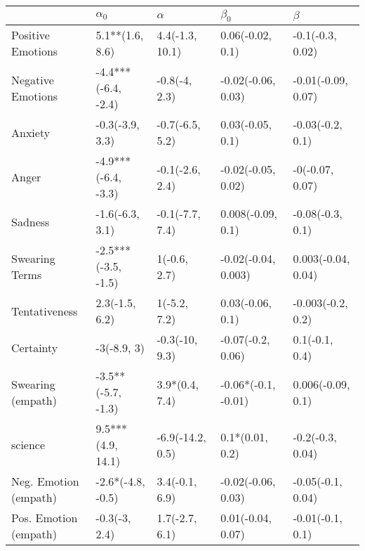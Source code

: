 \begin{tabular}{lllll}
\toprule
{} &           $\alpha_0$ &          $\alpha$ &            $\beta_0$ &             $\beta$ \\
\midrule
Positive Emotions     &      5.1**(1.6, 8.6) &   4.4(-1.3, 10.1) &     0.06(-0.02, 0.1) &    -0.1(-0.3, 0.02) \\
Negative Emotions     &  -4.4***(-6.4, -2.4) &     -0.8(-4, 2.3) &   -0.02(-0.06, 0.03) &  -0.01(-0.09, 0.07) \\
Anxiety               &      -0.3(-3.9, 3.3) &   -0.7(-6.5, 5.2) &     0.03(-0.05, 0.1) &    -0.03(-0.2, 0.1) \\
Anger                 &  -4.9***(-6.4, -3.3) &   -0.1(-2.6, 2.4) &   -0.02(-0.05, 0.02) &     -0(-0.07, 0.07) \\
Sadness               &      -1.6(-6.3, 3.1) &   -0.1(-7.7, 7.4) &    0.008(-0.09, 0.1) &    -0.08(-0.3, 0.1) \\
Swearing Terms        &  -2.5***(-3.5, -1.5) &      1(-0.6, 2.7) &  -0.02(-0.04, 0.003) &  0.003(-0.04, 0.04) \\
Tentativeness         &       2.3(-1.5, 6.2) &      1(-5.2, 7.2) &     0.03(-0.06, 0.1) &   -0.003(-0.2, 0.2) \\
Certainty             &          -3(-8.9, 3) &    -0.3(-10, 9.3) &    -0.07(-0.2, 0.06) &      0.1(-0.1, 0.4) \\
Swearing (empath)     &   -3.5**(-5.7, -1.3) &    3.9*(0.4, 7.4) &  -0.06*(-0.1, -0.01) &   0.006(-0.09, 0.1) \\
science               &    9.5***(4.9, 14.1) &  -6.9(-14.2, 0.5) &      0.1*(0.01, 0.2) &    -0.2(-0.3, 0.04) \\
Neg. Emotion (empath) &    -2.6*(-4.8, -0.5) &    3.4(-0.1, 6.9) &   -0.02(-0.06, 0.03) &   -0.05(-0.1, 0.04) \\
Pos. Emotion (empath) &        -0.3(-3, 2.4) &    1.7(-2.7, 6.1) &    0.01(-0.04, 0.07) &    -0.01(-0.1, 0.1) \\
\bottomrule
\end{tabular}
